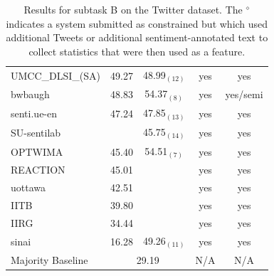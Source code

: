 \begin{table}[t!]
\begin{small}
\begin{tabular}{l@{ }c@{ }c@{ }c@{ }c}
    UMCC\_DLSI\_(SA) & 49.27 & 48.99$_{(12)}$ & yes & yes\\
    bwbaugh & 48.83 & 54.37$_{(8)}$ & yes & yes/semi\\
    senti.ue-en & 47.24 & 47.85$_{(13)}$ & yes & yes\\
    SU-sentilab &  & 45.75$_{(14)}$ & yes & yes\\
    OPTWIMA & 45.40 & 54.51$_{(7)}$ & yes & yes\\
    REACTION & 45.01 &  & yes & yes\\
    uottawa & 42.51 &  & yes & yes\\
    IITB & 39.80 &  & yes & yes\\
    IIRG & 34.44 &  & yes & yes\\
    sinai & 16.28 & 49.26$_{(11)}$ & yes & yes\\
       \hline
    Majority Baseline & \multicolumn{2}{c}{29.19}  & N/A & N/A \\
    \hline
    \end{tabular}
    \end{small}
    \caption{\label{tab:TaskBTwitter}Results for subtask B on the Twitter dataset.
             The $^\diamond$ indicates a system submitted as constrained but which used additional Tweets or additional sentiment-annotated text
             to collect statistics that were then used as a feature.}
  \end{table}


